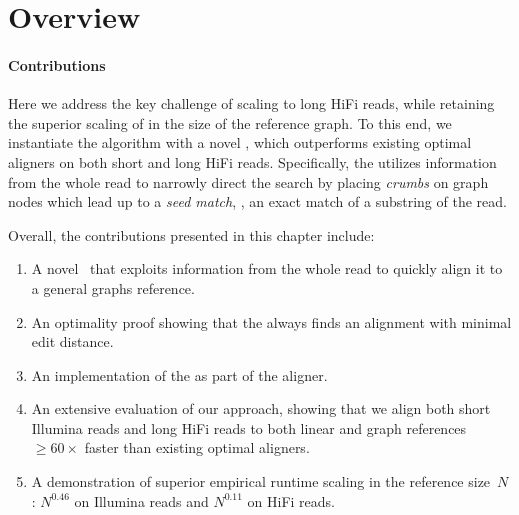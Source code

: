 \section{Overview}

\paragraph{Contributions}
Here we address the key challenge of scaling to long HiFi reads, while retaining
the superior scaling of \astarix in the size of the reference graph. To this
end, we instantiate the \A algorithm with a novel \seedh, which outperforms
existing optimal aligners on both short and long HiFi reads. Specifically, the
\seedh utilizes information from the whole read to narrowly direct the \A search
by placing \emph{crumbs} on graph nodes which lead up to a \emph{seed match},
\ie, an exact match of a substring of the read.

Overall, the contributions presented in this chapter include:
\begin{enumerate}
    \item A novel \A~\seedh that exploits information from the whole read to
    quickly align it to a general graphs reference.
    \item An optimality proof showing that the \seedh always finds an alignment
    with minimal edit distance.
	\item An implementation of the \seedh as part of the \astarix aligner.
    \item An extensive evaluation of our approach, showing that we align both
    short Illumina reads and long HiFi reads to both linear and graph references
    $\geq 60 \times$ faster than existing optimal aligners.
    \item A demonstration of superior empirical runtime scaling in the reference
    size~$N$: $N^{0.46}$ on Illumina reads and $N^{0.11}$ on HiFi reads.
\end{enumerate}

